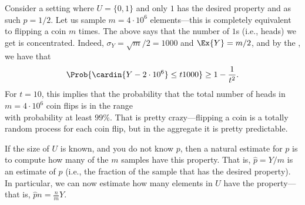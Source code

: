 \begin{example}
    Consider a setting where $U = \{ 0,1 \}$ and only $1$ has the desired
    property and as such $p=1/2$. Let us sample $m=4\cdot 10^6$ elements---this
    is completely equivalent to flipping a coin $m$ times. The above says
    that the number of $1$s (i.e., heads) we get is concentrated. Indeed,
    $\sigma_Y = \sqrt{m}/2 = 1000$ and $\Ex{Y}=m/2$, and by the , we have that
    \begin{equation*}
        \Prob{ \cardin{Y - 2\cdot 10^6} \leq t 1000 }
        \geq 1 - \frac{1}{t^2}.
    \end{equation*}
    For $t=10$, this implies that the probability that the total number
    of heads in $m=4\cdot 10^6$ coin flips is in the range
    \begin{equation*}
        [2,000,000 - 10,000, 2,000,000 + 10,000]
    \end{equation*}
    with probability at least $99\%$. That is pretty crazy---flipping a
    coin is a totally random process for each coin flip, but in the
    aggregate it is pretty predictable.
\end{example}

\begin{example}
    If the size of $U$ is known, and you do not know $p$, then a natural
    estimate for $p$ is to compute how many of the $m$ samples have this
    property.  That is, $\widehat{p} = Y/m$ is an estimate of $p$ (i.e.,
    the fraction of the sample that has the desired property). In
    particular, we can now estimate how many elements in $U$ have the
    property---that is, $\widehat{p} n = \tfrac{n}{m} Y$.
\end{example}


